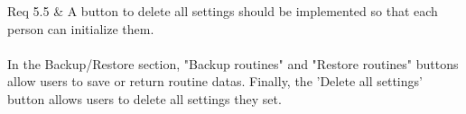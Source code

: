 \begin{enumerate}[label=\arabic*.]
\begin{enumerate}[label*={\arabic*.},ref=\theenumi.\arabic*]
{                        Req 5.5 & A button to delete all settings should be implemented so that each person can initialize them.\\\\
                    }
                    In the Backup/Restore section, "Backup routines" and "Restore routines" buttons allow users to save or return routine datas. Finally, the 'Delete all settings' button allows users to delete all settings they set.\\\\
          \end{enumerate}
\end{enumerate}